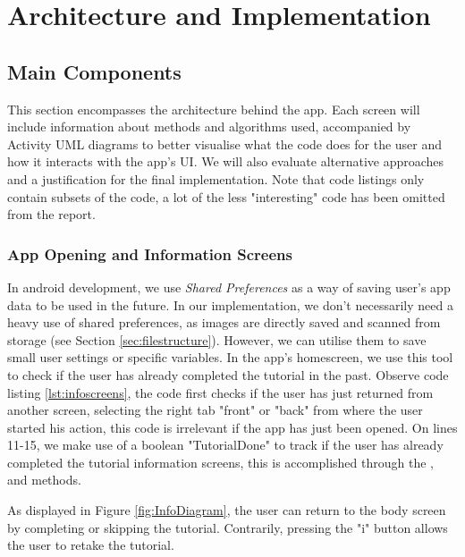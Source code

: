 \chapter{Architecture and Implementation}
\section{Main Components}
This section encompasses the architecture behind the app. Each screen will include information about methods and algorithms used, accompanied by Activity UML diagrams to better visualise what the code does for the user and how it interacts with the app's UI. We will also evaluate alternative approaches and a justification for the final implementation. Note that code listings only contain subsets of the code, a lot of the less "interesting" code has been omitted from the report.


\subsection{App Opening and Information Screens}

In android development, we use \emph{Shared Preferences} as a way of saving user's app data to be used in the future. In our implementation, we don't necessarily need a heavy use of shared preferences, as images are directly saved and scanned from storage (see Section \ref{sec:filestructure}). However, we can utilise them to save small user settings or specific variables. In the app's homescreen, we use this tool to check if the user has already completed the tutorial in the past. Observe code listing \ref{lst:infoscreens}, the code first checks if the user has just returned from another screen, selecting the right tab "front" or "back" from where the user started his action, this code is irrelevant if the app has just been opened. On lines 11-15, we make use of a boolean "TutorialDone" to track if the user has already completed the tutorial information screens, this is accomplished through the ,  and  methods.

As displayed in Figure \ref{fig:InfoDiagram}, the user can return to the body screen by completing or skipping the tutorial. Contrarily, pressing the "i" button allows the user to retake the tutorial. 

